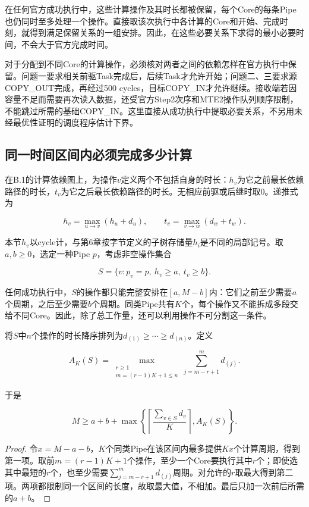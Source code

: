 \documentclass[anonymous,notoc]{gmcm2026}
\begin{document}
在任何官方成功执行中，这些计算操作及其时长都被保留，每个Core的每条Pipe也仍同时至多处理一个操作。直接取该次执行中各计算的Core和开始、完成时刻，就得到满足保留关系的一组安排。因此，在这些必要关系下求得的最小必要时间，不会大于官方完成时间。

对于分配到不同Core的计算操作，必须核对两者之间的依赖怎样在官方执行中保留。问题一要求相关前驱Task完成后，后续Task才允许开始；问题二、三要求源COPY\_OUT完成，再经过500 cycles，目标COPY\_IN才允许继续。接收端若因容量不足而需要再次读入数据，还受官方Step2次序和MTE2操作队列顺序限制，不能跳过所需的基础COPY\_IN。这里直接从成功执行中提取必要关系，不另用未经最优性证明的调度程序估计下界。

\subsection{同一时间区间内必须完成多少计算}

在B.1的计算依赖图上，为操作\(v\)定义两个不包括自身的时长：\(h_v\)为它之前最长依赖路径的时长，\(t_v\)为它之后最长依赖路径的时长。无相应前驱或后继时取0。递推式为

\[h_v=\max_{u\to v}(h_u+d_u),\qquad t_v=\max_{v\to w}(d_w+t_w).\]

本节\(h_v\)以cycle计，与第6章按字节定义的子树存储量\(h_i\)是不同的局部记号。取\(a,b\ge0\)，选定一种Pipe \(p\)，考虑非空操作集合

\[S=\{v:p_v=p,\ h_v\ge a,\ t_v\ge b\}.\]

任何成功执行中，\(S\)的操作都只能完整安排在\([a,M-b]\)内：它们之前至少需要\(a\)个周期，之后至少需要\(b\)个周期。同类Pipe共有\(K\)个，每个操作又不能拆成多段交给不同Core。因此，除了总工作量，还可以利用操作不可分割这一条件。

将\(S\)中\(n\)个操作的时长降序排列为\(d_{(1)}\ge\cdots\ge d_{(n)}\)。定义

\[A_K(S)=\max_{\substack{r\ge1\\m=(r-1)K+1\le n}}\sum_{j=m-r+1}^{m}d_{(j)}.\]

于是

\[M\ge a+b+\max\left\{\left\lceil\frac{\sum_{v\in S}d_v}{K}\right\rceil,A_K(S)\right\}.\]

\begin{proof} 令\(x=M-a-b\)，\(K\)个同类Pipe在该区间内最多提供\(Kx\)个计算周期，得到第一项。取前\(m=(r-1)K+1\)个操作，至少一个Core要执行其中\(r\)个；即使选其中最短的\(r\)个，也至少需要\(\sum_{j=m-r+1}^{m}d_{(j)}\)周期。对允许的\(r\)取最大得到第二项。两项都限制同一个区间的长度，故取最大值，不相加。最后只加一次前后所需的\(a+b\)。\end{proof}
\end{document}
